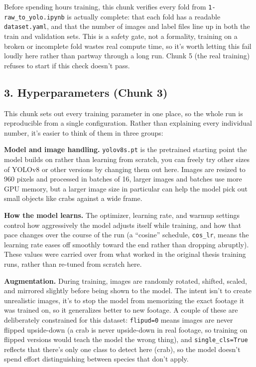\documentclass[
]{book}
\begin{document}
Before spending hours training, this chunk verifies every fold from \texttt{1-raw\_to\_yolo.ipynb} is actually complete: that each fold has a readable \texttt{dataset.yaml}, and that the number of images and label files line up in both the train and validation sets. This is a safety gate, not a formality, training on a broken or incomplete fold wastes real compute time, so it's worth letting this fail loudly here rather than partway through a long run. Chunk 5 (the real training) refuses to start if this check doesn't pass.

\subsection*{3. Hyperparameters (Chunk 3)}\label{hyperparameters-chunk-3}

This chunk sets out every training parameter in one place, so the whole run is reproducible from a single configuration. Rather than explaining every individual number, it's easier to think of them in three groups:

\textbf{Model and image handling.} \texttt{yolov8s.pt} is the pretrained starting point the model builds on rather than learning from scratch, you can freely try other sizes of YOLOv8 or other versions by changing them out here. Images are resized to 960 pixels and processed in batches of 16, larger images and batches use more GPU memory, but a larger image size in particular can help the model pick out small objects like crabs against a wide frame.

\textbf{How the model learns.} The optimizer, learning rate, and warmup settings control how aggressively the model adjusts itself while training, and how that pace changes over the course of the run (a ``cosine'' schedule, \texttt{cos\_lr}, means the learning rate eases off smoothly toward the end rather than dropping abruptly). These values were carried over from what worked in the original thesis training runs, rather than re-tuned from scratch here.

\textbf{Augmentation.} During training, images are randomly rotated, shifted, scaled, and mirrored slightly before being shown to the model. The intent isn't to create unrealistic images, it's to stop the model from memorizing the exact footage it was trained on, so it generalizes better to new footage. A couple of these are deliberately constrained for this dataset: \texttt{flipud=0} means images are never flipped upside-down (a crab is never upside-down in real footage, so training on flipped versions would teach the model the wrong thing), and \texttt{single\_cls=True} reflects that there's only one class to detect here (crab), so the model doesn't spend effort distinguishing between species that don't apply.
\end{document}
